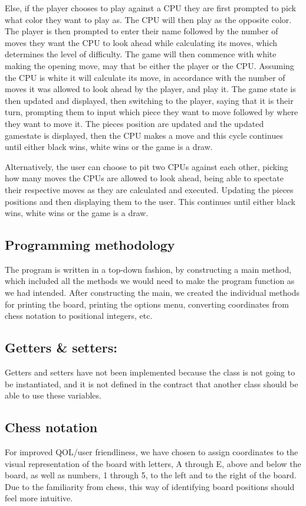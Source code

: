 \documentclass[12pt, a4paper]{article}
\begin{document}
Else, if the player chooses to play against a CPU they are first prompted to pick what color they want to play as. The CPU will then play as the opposite color. The player is then prompted to enter their name followed by the number of moves they want the CPU to look ahead while calculating its moves, which determines the level of difficulty. The game will then commence with white making the opening move, may that be either the player or the CPU. Assuming the CPU is white it will calculate its move, in accordance with the number of moves it was allowed to look ahead by the player, and play it. The game state is then updated and displayed, then switching to the player, saying that it is their turn, prompting them to input which piece they want to move followed by where they want to move it. The pieces position are updated and the updated gamestate is displayed, then the CPU makes a move and this cycle continues until either black wins, white wins or the game is a draw. 

Alternatively, the user can choose to pit two CPUs against each other, picking how many moves the CPUs are allowed to look ahead, being able to spectate their respective moves as they are calculated and executed. Updating the pieces positions and then displaying them to the user. This continues until either black wins, white wins or the game is a draw.

\subsection{Programming methodology}
The program is  written in a top-down fashion, by constructing a main method, which included all the methods we would need to make the program function as we had intended. After constructing the main, we created the individual methods for printing the board, printing the options menu, converting coordinates from chess notation to positional integers, etc.

\subsection{Getters \& setters:}
Getters and setters have not been implemented because the class is not going to be instantiated, and it is not defined in the contract that another class should be able to use these variables.	

\newpage

\subsection{Chess notation}
For improved QOL/user friendliness, we have chosen to assign coordinates to the visual representation of the board with letters, A through E, above and below the board, as well as numbers, 1 through 5, to the left and to the right of the board. Due to the familiarity from chess, this way of identifying board positions should feel more intuitive.
\end{document}
